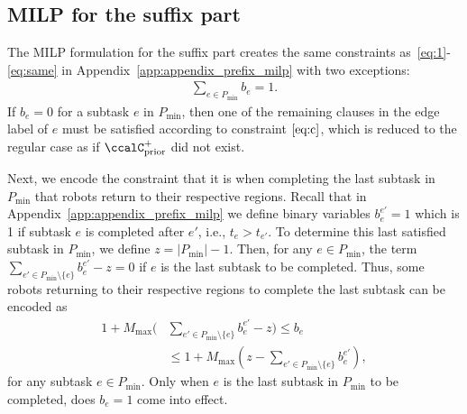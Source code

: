 \documentclass[Afour,sageh,times]{sagej}
\newcounter{phase} \setcounter{phase}{0}
\newcounter{subphase}[phase] \setcounter{subphase}{0}
\begin{document}
{{{\subsection{MILP for the suffix part}\label{app:appendix_suffix_milp}
The MILP formulation for the suffix part creates the same  constraints as~\eqref{eq:1}-\eqref{eq:same} in Appendix~\ref{app:appendix_prefix_milp} with two exceptions:
\begin{align}\label{eq:one_suffix}
  \sum_{e \in P_{\text{min}}} b_e = 1.
\end{align}
If $b_e=0$ for a subtask $e$ in $P_{\text{min}}$, then one of the remaining clauses in the edge label of $e$ must be satisfied according to constraint $\eqref{eq:c}$, which is reduced to the regular case as if  $\ccalC_{\text{prior}}^+$  did not exist.

Next, we encode the constraint that it is when completing the last subtask in $P_{\text{min}}$ that robots return to their respective regions. Recall that in Appendix~\ref{app:appendix_prefix_milp} we define binary variables $b_{e}^{e'}=1$ which is 1 if subtask $e$ is completed after  $e'$, i.e., $t_e >  t_{e'}$. To determine this last satisfied subtask in $P_{\text{min}}$,
  we define $z = |P_{\text{min}}| -1$. Then, for any $e \in P_{\text{min}}$, the term $\sum_{e' \in  P_{\text{min}}\setminus \{e \} } b_{e}^{e'} - z  = 0$ if $e$ is the last subtask to be completed. Thus, some robots returning to their respective regions to complete the last subtask  can be encoded as
\begin{align}\label{eq:lastsubtask}
  1 + M_{\text{max}} ( &  \sum_{e' \in  P_{\text{min}}\setminus \{e \} } b_{e}^{e'} - z)  \leq  b_e \nonumber \\
  & \leq 1 + M_{\text{max}} (z - \sum_{e' \in  P_{\text{min}}\setminus \{e \} } b_{e}^{e'}),
\end{align}
for any subtask $e \in P_{\text{min}}$. Only when $e$ is the last subtask in $P_{\text{min}}$ to be completed, does $b_e = 1$ come into effect.


}}}
\end{document}
